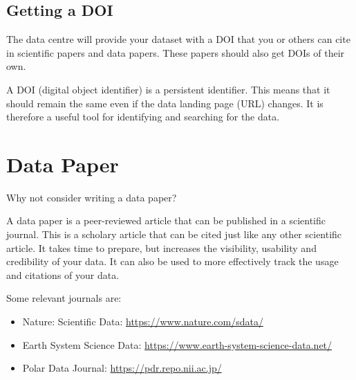 \documentclass[a4paper,english, 11pt]{article}
\begin{document}
\subsection{Getting a DOI}
\label{s:doi}

The data centre will provide your dataset with a DOI that you or others can cite in scientific papers and data papers. These papers should also get DOIs of their own.

A DOI (digital object identifier) is a persistent identifier. This means that it should remain the same even if the data landing page (URL) changes. It is therefore a useful tool for identifying and searching for the data.

\section{Data Paper}
\label{s:datapaper}

Why not consider writing a data paper?

A data paper is a peer-reviewed article that can be published in a scientific journal. This is a scholary article that can be cited just like any other scientific article. It takes time to prepare, but increases the visibility, usability and credibility of your data. It can also be used to more effectively track the usage and citations of your data. 

Some relevant journals are:
\begin{itemize}
\item Nature: Scientific Data: \url{https://www.nature.com/sdata/}
\item Earth System Science Data: \url{https://www.earth-system-science-data.net/}
\item Polar Data Journal: \url{https://pdr.repo.nii.ac.jp/}
\end{itemize}

 
\end{document}
